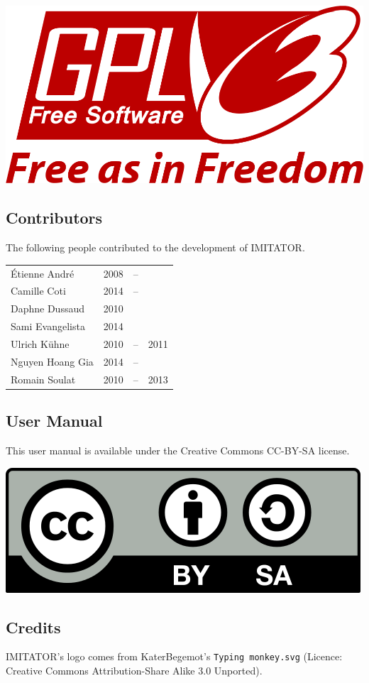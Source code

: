 \documentclass[a4paper,11pt]{report}
\newcommand{\imitator}{\textsf{IMITATOR}}
\newcommand{\stylePath}[1]{\textcolor{pathcolor}{\texttt{#1}}}
\begin{document}
\begin{center}
	\includegraphics[width=.3\textwidth]{images/GPLv3_Logo.png}
\end{center}

\bigskip

\subsection*{Contributors}
The following people contributed to the development of \imitator{}.


\begin{tabular}{l l @{ } c @{ } l}
	Étienne André & 2008 & -- & \\
	Camille Coti & 2014 & -- & \\
	Daphne Dussaud & 2010 & & \\
	Sami Evangelista & 2014 & & \\
	Ulrich Kühne & 2010 & -- & 2011 \\
	Nguyen Hoang Gia & 2014 & -- & \\
	Romain Soulat & 2010 & -- & 2013 \\
\end{tabular}



\bigskip

\subsection*{User Manual}
This user manual is available under the Creative Commons CC-BY-SA license.

\begin{center}
	\includegraphics[width=.2\textwidth]{images/CC-BY-SA_500.png}
\end{center}

\bigskip

\subsection*{Credits}
\imitator{}'s logo comes from KaterBegemot's \stylePath{Typing monkey.svg} (Licence: Creative Commons Attribution-Share Alike 3.0 Unported).
\end{document}
